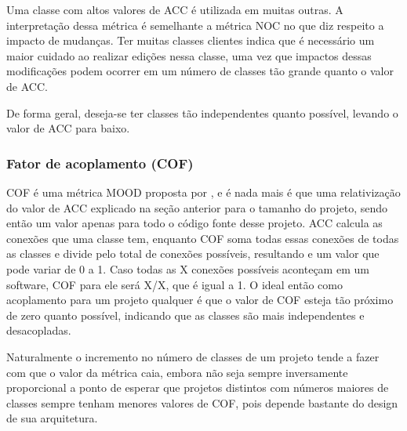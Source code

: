 Uma classe com altos valores de ACC é utilizada em muitas outras. A interpretação dessa métrica é semelhante a métrica NOC no que diz respeito a impacto de mudanças. Ter muitas classes clientes indica que é necessário um maior cuidado ao realizar edições nessa classe, uma vez que impactos dessas modificações podem ocorrer em um número de classes tão grande quanto o valor de ACC.

De forma geral, deseja-se ter classes tão independentes quanto possível, levando o valor de ACC para baixo.

\subsubsection{Fator de acoplamento (COF)}

COF é uma métrica MOOD proposta por , e é nada mais é que uma relativização do valor de ACC explicado na seção anterior para o tamanho do projeto, sendo então um valor apenas para todo o código fonte desse projeto. ACC calcula as conexões que uma classe tem, enquanto COF soma todas essas conexões de todas as classes e divide pelo total de conexões possíveis, resultando e um valor que pode variar de 0 a 1. Caso todas as X conexões possíveis aconteçam em um software, COF para ele será X/X, que é igual a 1. O ideal então como acoplamento para um projeto qualquer é que o valor de COF esteja tão próximo de zero quanto possível, indicando que as classes são mais independentes e desacopladas.

Naturalmente o incremento no número de classes de um projeto tende a fazer com que o valor da métrica caia, embora não seja sempre inversamente proporcional a ponto de esperar que projetos distintos com números maiores de classes sempre tenham menores valores de COF, pois depende bastante do design de sua arquitetura.
